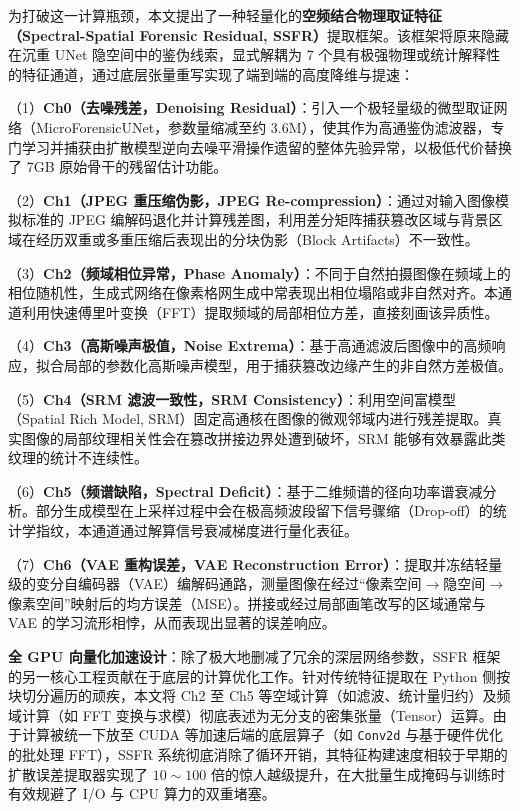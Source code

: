 \documentclass[UTF8, a4paper, 12pt]{ctexrep}
\begin{document}
为打破这一计算瓶颈，本文提出了一种轻量化的\textbf{空频结合物理取证特征（Spectral-Spatial Forensic Residual, SSFR）}提取框架。该框架将原来隐藏在沉重 UNet 隐空间中的鉴伪线索，显式解耦为 7 个具有极强物理或统计解释性的特征通道，通过底层张量重写实现了端到端的高度降维与提速：

（1）\textbf{Ch0（去噪残差，Denoising Residual）}：引入一个极轻量级的微型取证网络（MicroForensicUNet，参数量缩减至约 3.6M），使其作为高通鉴伪滤波器，专门学习并捕获由扩散模型逆向去噪平滑操作遗留的整体先验异常，以极低代价替换了 7GB 原始骨干的残留估计功能。

（2）\textbf{Ch1（JPEG 重压缩伪影，JPEG Re-compression）}：通过对输入图像模拟标准的 JPEG 编解码退化并计算残差图，利用差分矩阵捕获篡改区域与背景区域在经历双重或多重压缩后表现出的分块伪影（Block Artifacts）不一致性。

（3）\textbf{Ch2（频域相位异常，Phase Anomaly）}：不同于自然拍摄图像在频域上的相位随机性，生成式网络在像素格网生成中常表现出相位塌陷或非自然对齐。本通道利用快速傅里叶变换（FFT）提取频域的局部相位方差，直接刻画该异质性。

（4）\textbf{Ch3（高斯噪声极值，Noise Extrema）}：基于高通滤波后图像中的高频响应，拟合局部的参数化高斯噪声模型，用于捕获篡改边缘产生的非自然方差极值。

（5）\textbf{Ch4（SRM 滤波一致性，SRM Consistency）}：利用空间富模型（Spatial Rich Model, SRM）固定高通核在图像的微观邻域内进行残差提取。真实图像的局部纹理相关性会在篡改拼接边界处遭到破坏，SRM 能够有效暴露此类纹理的统计不连续性。

（6）\textbf{Ch5（频谱缺陷，Spectral Deficit）}：基于二维频谱的径向功率谱衰减分析。部分生成模型在上采样过程中会在极高频波段留下信号骤缩（Drop-off）的统计学指纹，本通道通过解算信号衰减梯度进行量化表征。

（7）\textbf{Ch6（VAE 重构误差，VAE Reconstruction Error）}：提取并冻结轻量级的变分自编码器（VAE）编解码通路，测量图像在经过“像素空间$\rightarrow$隐空间$\rightarrow$像素空间”映射后的均方误差（MSE）。拼接或经过局部画笔改写的区域通常与 VAE 的学习流形相悖，从而表现出显著的误差响应。



\textbf{全 GPU 向量化加速设计}：除了极大地删减了冗余的深层网络参数，SSFR 框架的另一核心工程贡献在于底层的计算优化工作。针对传统特征提取在 Python 侧按块切分遍历的顽疾，本文将 Ch2 至 Ch5 等空域计算（如滤波、统计量归约）及频域计算（如 FFT 变换与求模）彻底表述为无分支的密集张量（Tensor）运算。由于计算被统一下放至 CUDA 等加速后端的底层算子（如 \texttt{Conv2d} 与基于硬件优化的批处理 FFT），SSFR 系统彻底消除了循环开销，其特征构建速度相较于早期的扩散误差提取器实现了 $10 \sim 100$ 倍的惊人越级提升，在大批量生成掩码与训练时有效规避了 I/O 与 CPU 算力的双重堵塞。
\end{document}
